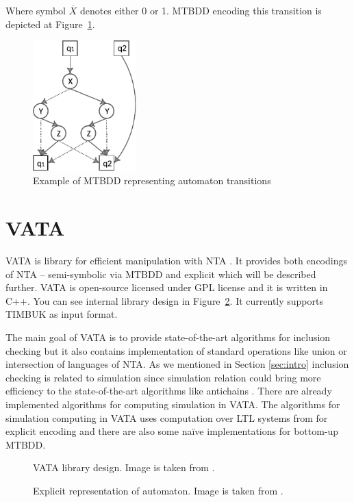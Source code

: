 \documentclass[a4paper, 12pt]{article}
\begin{document}
Where symbol $\overline{X}$ denotes either 0 or 1. MTBDD encoding this transition is depicted at Figure~\ref{fig:MTBDD}.

\begin{figure}[h]
\centering
\includegraphics[width=4cm]{MTBDD}
\caption{Example of MTBDD representing automaton transitions \cite{fiedor:wsks}}
\label{fig:MTBDD}
\end{figure}


\section{VATA}
\label{sec:vata}
VATA is library for efficient manipulation with NTA \cite{libvata}.
It provides both encodings of NTA -- semi-symbolic via MTBDD and explicit which will be described further.
VATA is open-source licensed under GPL license and it is written in C++. You can see internal library design in Figure~\ref{fig:lib_design}.
It currently supports TIMBUK as input format. 

The main goal of VATA is to provide state-of-the-art algorithms for inclusion checking
but it also contains implementation of standard operations like union or intersection of languages of NTA.
As we mentioned in Section \ref{sec:intro} inclusion checking is related to simulation
since simulation relation could bring more efficiency to the state-of-the-art algorithms like antichains \cite{tacas10}.
There are already implemented algorithms for computing simulation in VATA.
The algorithms for simulation computing in VATA uses computation over LTL systems from \cite{tacas08} for explicit encoding
and there are also some na{\"i}ve implementations for bottom-up MTBDD.

\begin{figure}[h]
	\centering
	
	\caption{VATA library design. Image is taken from \cite{libvata}.}
	\label{fig:lib_design}
\end{figure}

\begin{figure}[h]
	\centering
	
	\caption{Explicit representation of automaton. Image is taken from \cite{libvata}.}
	\label{fig:explicit}
\end{figure}
\end{document}
